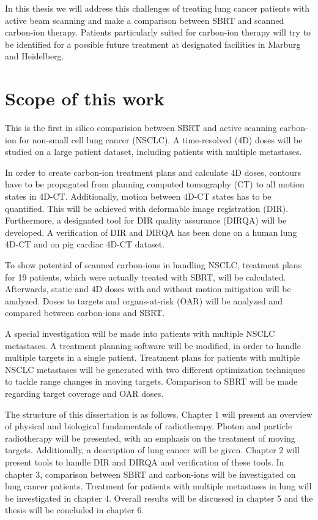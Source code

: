 \documentclass[type=dr, dr=rernat, accentcolor=tud7b,colorbacktitle, bigchapter, openright, twoside, 12pt ]{tudthesis}
\begin{document}
In this thesis we will address this challenges of treating lung cancer patients with active beam scanning and 
make a comparison between SBRT and scanned carbon-ion therapy. Patients particularly suited for carbon-ion therapy will try to be identified for a possible future treatment at designated facilities in Marburg and Heidelberg. 



\newpage

\section*{Scope of this work}

This is the first in silico comparision between SBRT and active scanning carbon-ion for non-small cell lung cancer (NSCLC). A time-resolved (4D) doses will be studied on a large patient dataset, including patients with multiple metastases.

In order to create carbon-ion treatment plans and calculate 4D doses, contours have to be propagated from planning computed tomography (CT) to all motion states in 4D-CT. Additionally, motion between 4D-CT states has to be quantified. 
This will be achieved with deformable image registration (DIR). 
Furthermore, a designated tool for DIR quality assurance (DIRQA) will be developed. A verification of DIR and DIRQA has been done on a human lung 4D-CT and on pig cardiac 4D-CT dataset.

To show potential of scanned carbon-ions in handling NSCLC, treatment plans for 19 patients, which were actually treated with SBRT, will be calculated. Afterwards, static and 4D doses with and without motion
mitigation will be analyzed. Doses to targets and organs-at-risk (OAR) will be analyzed and compared between carbon-ions and SBRT.

A special investigation will be made into patients with multiple NSCLC metastases. A treatment planning software will be modified, in order to handle multiple targets in a single patient. 
Treatment plans for patients with multiple NSCLC metastases will be generated with two different optimization techniques to tackle range changes in moving targets. Comparison to SBRT will be made regarding target coverage and OAR doses.

The structure of this dissertation is as follows. Chapter 1 will present an overview of physical and biological fundamentals of radiotherapy. Photon and particle radiotherapy will be presented, with an emphasis on the treatment of moving targets.
Additionally, a description of lung cancer will be given. Chapter 2 will present tools to handle DIR and DIRQA and verification of these tools. In chapter 3, comparison between SBRT and carbon-ions will be investigated on lung cancer patients.
Treatment for patients with multiple metastases in lung will be investigated in chapter 4. Overall results will be discussed in chapter 5 and the thesis will be concluded in chapter 6.




{}
% 
\end{document}
